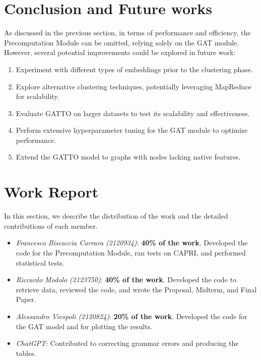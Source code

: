 \documentclass[12pt,conference]{ieeeconf} %
\begin{document}
\section{Conclusion and Future works}
As discussed in the previous section, in terms of performance and efficiency, the Precomputation Module can be omitted, relying solely on the GAT module.\\
However, several potential improvements could be explored in future work:
\begin{enumerate}
\item Experiment with different types of embeddings prior to the clustering phase.
\item Explore alternative clustering techniques, potentially leveraging MapReduce for scalability.
\item Evaluate GATTO on larger datasets to test its scalability and effectiveness.
\item Perform extensive hyperparameter tuning for the GAT module to optimize performance.
\item Extend the GATTO model to graphs with nodes lacking native features.
\end{enumerate}



\vspace{\fill}
\section*{Work Report}
In this section, we describe the distribution of the work and the detailed contributions of each member.
\begin{itemize}
    \item \textit{Francesco Biscaccia Carrara (2120934)}: {\textbf{40\% of the work}. Developed the code for the Precomputation Module, ran tests on CAPRI, and performed statistical tests.}
    \item \textit{Riccardo Modolo (2123750)}: {\textbf{40\% of the work}. Developed the code to retrieve data, reviewed the code, and wrote the Proposal, Midterm, and Final Paper.}
    \item \textit{Alessandro Viespoli (2120824)}: {\textbf{20\% of the work}. Developed the code for the GAT model and for plotting the results.}
    \item \textit{ChatGPT}: {Contributed to correcting grammar errors and producing the tables.}
\end{itemize}
\printbibliography
\newpage

\end{document}
